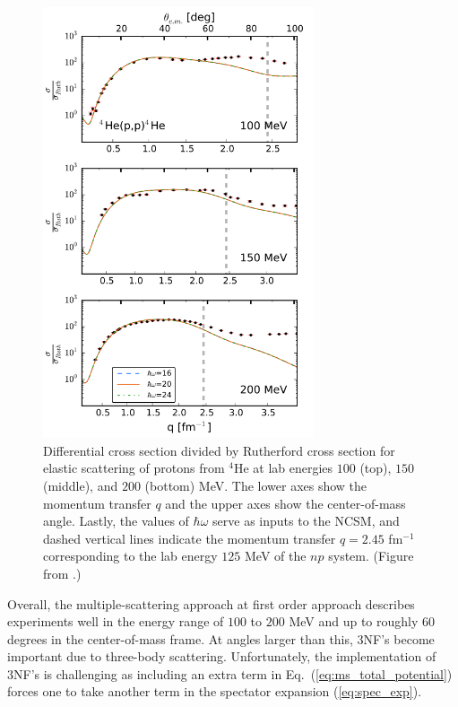 \documentclass[preprintnumbers,floatfix,aps,prc,preprint,nofootinbib]{revtex4-1}
\begin{document}
%
\begin{figure}
	\captionsetup{singlelinecheck=false,justification=raggedright}
	\centering
	\includegraphics[width=8cm]{burrows_figure}
	\caption{Differential cross section divided by Rutherford cross section for elastic scattering of protons from $^{4}$He at lab energies $100$ (top), $150$ (middle), and $200$ (bottom) MeV. The lower axes show the momentum transfer $q$ and the upper axes show the center-of-mass angle. Lastly, the values of $\hbar \omega$ serve as inputs to the NCSM, and dashed vertical lines indicate the momentum transfer $q = 2.45$ fm$^{-1}$ corresponding to the lab energy $125$ MeV of the $np$ system. (Figure from \cite{Burrows:2018ggt}.)}
	\label{fig:burrows_figure}
\end{figure}
%

Overall, the multiple-scattering approach at first order approach describes experiments well in the energy range of $100$ to $200$ MeV and up to roughly $60$ degrees in the center-of-mass frame. At angles larger than this, 3NF's become important due to three-body scattering. Unfortunately, the implementation of 3NF's is challenging as including an extra term in Eq.~(\ref{eq:ms_total_potential}) forces one to take another term in the spectator expansion (\ref{eq:spec_exp}).
		
	
\end{document}
